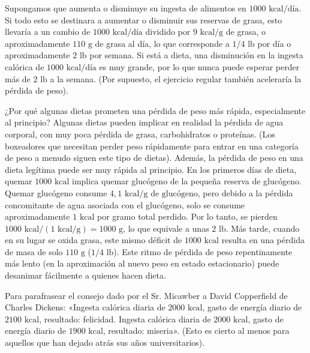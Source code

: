 \documentclass[12pt]{book}
\begin{document}
Supongamos que aumenta o disminuye su ingesta de alimentos en $1000\text{ kcal/día}$. Si todo esto se destinara a aumentar o disminuir sus reservas de grasa, esto llevaría a un cambio de $1000\text{ kcal/día}$ dividido por $9\text{ kcal/g}$ de grasa, o aproximadamente $110\text{ g}$ de grasa al día, lo que corresponde a $1/4\text{ lb}$ por día o aproximadamente $2\text{ lb}$ por semana. Si está a dieta, una disminución en la ingesta calórica de $1000\text{ kcal/día}$ es muy grande, por lo que nunca puede esperar perder más de $2\text{ lb}$ a la semana. (Por supuesto, el ejercicio regular también aceleraría la pérdida de peso).

¿Por qué algunas dietas prometen una pérdida de peso más rápida, especialmente al principio? Algunas dietas pueden implicar en realidad la pérdida de agua corporal, con muy poca pérdida de grasa, carbohidratos o proteínas. (Los boxeadores que necesitan perder peso rápidamente para entrar en una categoría de peso a menudo siguen este tipo de dietas). Además, la pérdida de peso en una dieta legítima puede ser muy rápida al principio. En los primeros días de dieta, quemar $1000\text{ kcal}$ implica quemar glucógeno de la pequeña reserva de glucógeno. Quemar glucógeno consume $4{,}1\text{ kcal/g de glucógeno}$, pero debido a la pérdida concomitante de agua asociada con el glucógeno, solo se consume aproximadamente $1\text{ kcal}$ por gramo total perdido. Por lo tanto, se pierden $1000\text{ kcal} / (1\text{ kcal/g}) = 1000\text{ g}$, lo que equivale a unas $2\text{ lb}$. Más tarde, cuando en su lugar se oxida grasa, este mismo déficit de $1000\text{ kcal}$ resulta en una pérdida de masa de solo $110\text{ g}$ ($1/4\text{ lb}$). Este ritmo de pérdida de peso repentinamente más lento (en la aproximación al nuevo peso en estado estacionario) puede desanimar fácilmente a quienes hacen dieta.

Para parafrasear el consejo dado por el Sr. Micawber a David Copperfield de Charles Dickens: «Ingesta calórica diaria de $2000\text{ kcal}$, gasto de energía diario de $2100\text{ kcal}$, resultado: felicidad. Ingesta calórica diaria de $2000\text{ kcal}$, gasto de energía diario de $1900\text{ kcal}$, resultado: miseria». (Esto es cierto al menos para aquellos que han dejado atrás sus años universitarios).
\end{document}
